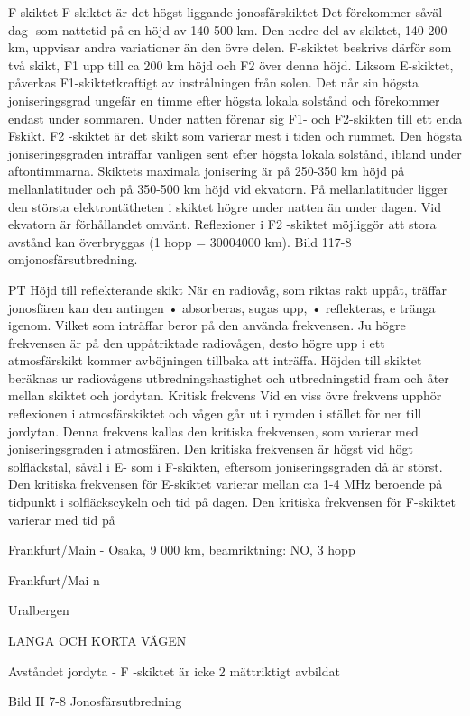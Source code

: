 F-skiktet
F-skiktet är det högst liggande jonosfärskiktet
Det förekommer såväl dag- som nattetid på
en höjd av 140-500 km. Den nedre del av
skiktet, 140-200 km, uppvisar andra variationer än den övre delen. F-skiktet beskrivs
därför som två skikt, F1 upp till ca 200 km
höjd och F2 över denna höjd.
Liksom E-skiktet, påverkas F1-skiktetkraftigt av instrålningen från solen. Det når sin
högsta joniseringsgrad ungefär en timme
efter högsta lokala solstånd och förekommer
endast under sommaren. Under natten förenar sig F1- och F2-skikten till ett enda Fskikt.
F2 -skiktet är det skikt som varierar mest i
tiden och rummet. Den högsta joniseringsgraden inträffar vanligen sent efter högsta
lokala solstånd, ibland under aftontimmarna.
Skiktets maximala jonisering är på 250-350
km höjd på mellanlatituder och på 350-500
km höjd vid ekvatorn. På mellanlatituder
ligger den största elektrontätheten i skiktet
högre under natten än under dagen. Vid
ekvatorn är förhållandet omvänt.
Reflexioner i F2 -skiktet möjliggör att stora
avstånd kan överbryggas (1 hopp = 30004000 km). Bild 117-8 omjonosfärsutbredning.

PT
Höjd till reflekterande skikt
När en radiovåg, som riktas rakt uppåt, träffar jonosfären kan den antingen
• absorberas, sugas upp,
• reflekteras,
e
tränga igenom.
Vilket som inträffar beror på den använda
frekvensen. Ju högre frekvensen är på den
uppåtriktade radiovågen, desto högre upp i
ett atmosfärskikt kommer avböjningen tillbaka att inträffa. Höjden till skiktet beräknas
ur radiovågens utbredningshastighet och
utbredningstid fram och åter mellan skiktet
och jordytan.
Kritisk frekvens
Vid en viss övre frekvens upphör reflexionen
i atmosfärskiktet och vågen går ut i rymden
i stället för ner till jordytan. Denna frekvens
kallas den kritiska frekvensen, som varierar
med joniseringsgraden i atmosfären. Den
kritiska frekvensen är högst vid högt solfläckstal, såväl i E- som i F-skikten, eftersom
joniseringsgraden då är störst. Den kritiska
frekvensen för E-skiktet varierar mellan c:a
1-4 MHz beroende på tidpunkt i solfläckscykeln och tid på dagen. Den kritiska frekvensen för F-skiktet varierar med tid på

Frankfurt/Main - Osaka, 9 000 km, beamriktning: NO, 3 hopp

Frankfurt/Mai n

Uralbergen

LANGA OCH KORTA VÄGEN

Avståndet jordyta - F -skiktet är icke
2
mättriktigt avbildat

Bild II 7-8 Jonosfärsutbredning

